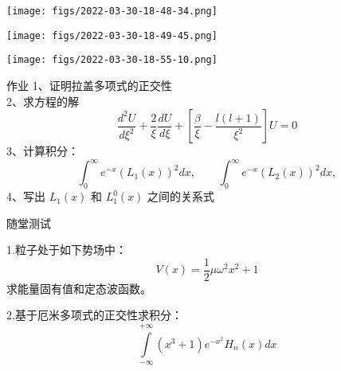 	{}
  \begin{center}
	   \texttt{[image: figs/2022-03-30-18-48-34.png]}
  \end{center}



	{}
  \begin{center}
	   \texttt{[image: figs/2022-03-30-18-49-45.png]}
  \end{center}



	{}
  \begin{center}
	   \texttt{[image: figs/2022-03-30-18-55-10.png]}
  \end{center}



	{作业}
	1、证明拉盖多项式的正交性\\
	2、求方程的解
	\begin{equation*}
		\frac{d^2 U}{d \xi ^2} + \frac{2}{\xi }\frac{d U }{d \xi}  +[\frac{\beta}{\xi} - \frac{l(l+1)}{\xi ^2}] U=0
	\end{equation*}	 
	3、计算积分：
	\begin{equation*}
		\int_{0}^{\infty}   e^{-x} ( L_1 (x) )^2 dx, \qquad  \int_{0}^{\infty}   e^{-x} ( L_2 (x) )^2 dx, 
	\end{equation*}	
	4、写出 $L_1 (x)$ 和 $L_1 ^0 (x)$ 之间的关系式
		


	{随堂测试}
	\begin{example} {1.粒子处于如下势场中：}
		\begin{equation*}
			V(x)= \frac{1}{2} \mu \omega ^2 x^2  +1
		\end{equation*}
		\hspace{2em}求能量固有值和定态波函数。
	\end{example}	
	\begin{example} {2.基于厄米多项式的正交性求积分：}
		\begin{equation*}
			\int\limits_{-\infty}^{+\infty} (x^3 +1)e^{-x^{2}} H_n(x) d x 
		\end{equation*}
	\end{example}	




